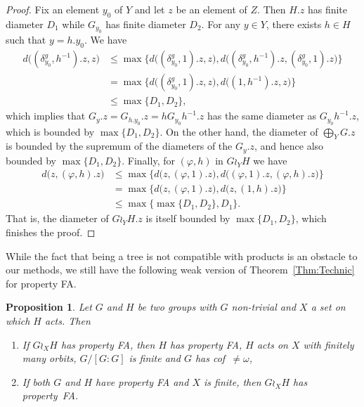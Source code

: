 \documentclass[a4paper]{article}
\newtheorem{prop}[lem]{Proposition}
\theoremstyle{definition}
\begin{document}
\begin{proof}
Fix an element $y_0$ of $Y$ and let $z$ be an element of $Z$.
Then $H.z$ has finite diameter $D_1$ while $G_{y_0}$ has finite diameter $D_2$.
For any $y\in Y$, there exists $h\in H$ such that $y=h.y_0$.
We have
\begin{align*}
	d\bigl((\delta_{y_0}^g,h^{-1}).z,z\bigr)&\leq\max\{d\bigl((\delta_{y_0}^g,1).z,z\bigr),d\bigl((\delta_{y_0}^g,h^{-1}).z,(\delta_{y_0}^g,1).z\bigr)\}\\
	&=\max\{d\bigl((\delta_{y_0}^g,1).z,z\bigr),d\bigl((1,h^{-1}).z,z\bigr)\}\\
	&\leq \max\{D_1,D_2\},
\end{align*}
which implies that $G_y.z=G_{h.y_0}.z=hG_{y_0}h^{-1}.z$ has the same diameter as $G_{y_0}h^{-1}.z$, which is bounded by $\max\{D_1,D_2\}$.
On the other hand, the diameter of $\bigoplus_YG.z$ is bounded by the supremum of the diameters of the $G_y.z$, and hence also bounded by $\max\{D_1,D_2\}$.
Finally, for $(\varphi,h)$ in $G\wr_YH$ we have 
\begin{align*}
	d\bigl(z,(\varphi,h).z\bigr)&\leq\max\{d\bigl(z,(\varphi,1).z\bigr),d\bigl((\varphi,1).z,(\varphi,h).z\bigr)\}\\
	&=\max\{d\bigl(z,(\varphi,1).z\bigr),d\bigl(z,(1,h).z\bigr)\}\\
	&\leq\max\{\max\{D_1,D_2\},D_1\}.
\end{align*}
That is, the diameter of $G\wr_YH.z$ is itself bounded by $\max\{D_1,D_2\}$, which finishes the proof.
\end{proof}
%
%
While the fact that being a tree is not compatible with products is an obstacle to our methods, we still have the following weak version of Theorem~\ref{Thm:Technic} for property FA.
%
%
\begin{prop}\label{Prop:WRFA}
Let $G$ and $H$ be two groups with $G$ non-trivial and $X$ a set on which $H$ acts.
Then
\begin{enumerate}
\item If $G\wr_XH$ has property FA, then $H$ has property FA, $H$ acts on $X$ with finitely many orbits, $G/[G:G]$ is finite and $G$ has cof~$\neq\omega$,
\item If both $G$ and $H$ have property FA and $X$ is finite, then $G\wr_XH$ has property~FA.
\end{enumerate}
\end{prop}
\end{document}
